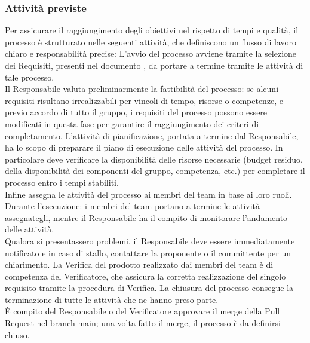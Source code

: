  \subsubsection{Attività previste}
 Per assicurare il raggiungimento degli obiettivi nel rispetto di tempi e qualità, il processo è strutturato nelle seguenti attività, che definiscono un flusso di lavoro chiaro e responsabilità precise:
    L’avvio del processo avviene tramite la selezione dei Requisiti, presenti nel documento , da portare a termine tramite le attività di tale processo.\\
    Il Responsabile valuta preliminarmente la fattibilità del processo: se alcuni requisiti risultano irrealizzabili per vincoli di tempo, risorse o competenze, e previo accordo di tutto il gruppo, i requisiti del processo possono essere modificati in questa fase per garantire il raggiungimento dei criteri di completamento.
    L’attività di pianificazione, portata a termine dal Responsabile, ha lo scopo di preparare il piano di esecuzione delle attività del processo. 
    In particolare deve verificare la disponibilità delle risorse necessarie (budget residuo, della disponibilità dei componenti del gruppo, competenza, etc.) per completare il processo entro i tempi stabiliti.\\
    Infine assegna le attività del processo ai membri del team in base ai loro ruoli.
    Durante l’esecuzione: i membri del team portano a termine le attività assegnategli, mentre il Responsabile ha il compito di monitorare l’andamento delle attività.\\
    Qualora si presentassero problemi, il Responsabile deve essere immediatamente notificato e in caso di stallo, contattare la proponente o il committente per un chiarimento.
    La Verifica del prodotto realizzato dai membri del team è di competenza del Verificatore, che assicura la corretta realizzazione del singolo requisito tramite la procedura di Verifica. 
    La chiusura del processo consegue la terminazione di tutte le attività che ne hanno preso parte.\\
    È compito del Responsabile o del Verificatore approvare il merge della Pull Request nel branch main; una volta fatto il merge, il processo è da definirsi chiuso.

